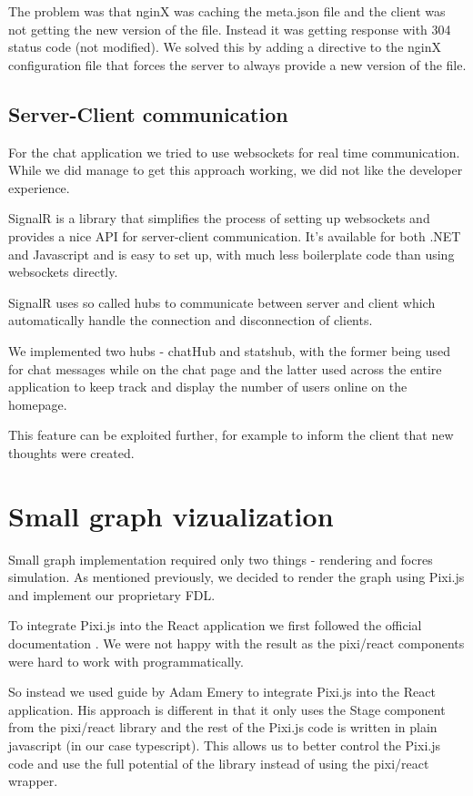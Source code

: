 The problem was that nginX was caching the meta.json file and the client was not getting the new version of the file.
Instead it was getting response with 304 status code (not modified).
We solved this by adding a directive to the nginX configuration file that forces the server to always provide a new version of the file.

\subsection{Server-Client communication}
For the chat application we tried to use \gls{websockets} for real time communication.
While we did manage to get this approach working, we did not like the developer experience.

SignalR is a library that simplifies the process of setting up websockets and provides a nice API for server-client communication.
It's available for both .NET and Javascript and is easy to set up, with much less boilerplate code than using websockets directly.

SignalR uses so called hubs to communicate between server and client which automatically handle
the connection and disconnection of clients.

We implemented two hubs - chatHub and statshub, with the former being used for chat messages while on the chat page
and the latter used across the entire application to keep track and display the number of users online on the homepage.

This feature can be exploited further, for example to inform the client that new thoughts were created.

\section{Small graph vizualization}
Small graph implementation required only two things - rendering and focres simulation.
As mentioned previously, we decided to render the graph using Pixi.js and implement our proprietary \gls{FDL}.

To integrate Pixi.js into the React application we first followed the official documentation \cite{pixijs_official_react_guide}.
We were not happy with the result as the pixi/react components were hard to work with programmatically.

So instead we used guide by Adam Emery \cite{pixijs_adam_emery_guide} to integrate Pixi.js into the React application.
His approach is different in that it only uses the Stage component from the pixi/react library
and the rest of the Pixi.js code is written in plain javascript (in our case typescript).
This allows us to better control the Pixi.js code and use the full potential of the library instead of using the pixi/react wrapper.

